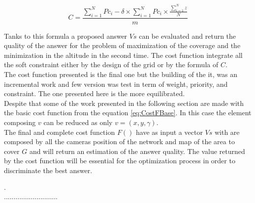 \begin{equation}\label{eq:CostF}
C =  \frac{\sum_{i=1}^N{Pc_i}  - \delta  \times \sum_{i=1}^N {Pc_i} \times \frac{\sum_{i=1}^N z}{N}  }{m}   
\end{equation}

Tanks to this formula a proposed answer $Vs$ can be evaluated and return the quality of the answer for the problem of maximization of the coverage and the minimization in the altitude in the second time.  The cost function integrate all the soft constraint either by the design of the grid or by the formula of $C$.\\

The cost function presented is  the final one but the building of the it, was an incremental work and few version was test in term of weight, priority, and constraint. The one presented here is the more equilibrated.\\ 
Despite that some of the work  presented in the following section are made with the basic cost function from the equation \ref{eq:CostFBase}. In this case the element composing $v$ can be reduced as only $v=(x,y,\gamma)$.\\

The final and complete cost function $F()$ have as input a vector $Vs$ with are composed by all the cameras position of the network and map of the area to cover $G$ and will return an estimation of the answer quality.
The value returned by the cost function will be essential for the optimization process in order to discriminate the best answer.  

 

.\\............................\\




